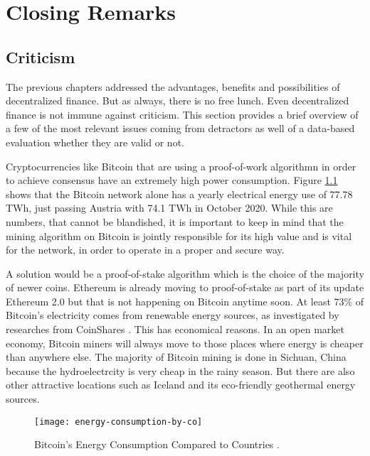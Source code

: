 \chapter{Closing Remarks}
\label{cha:ClosingRemarks}

\section{Criticism}

The previous chapters addressed the advantages, benefits and possibilities of decentralized finance. But as always, there is no free lunch.
Even decentralized finance is not immune against criticism. This section provides a brief overview of a few of the most relevant issues coming
from detractors as well of a data-based evaluation whether they are valid or not.

Cryptocurrencies like Bitcoin that are using a proof-of-work algorithmn in order to achieve consensus have an extremely high power consumption.
Figure \ref{fig:BtcEnergy} shows that the Bitcoin network alone has a yearly electrical energy use of 77.78 TWh, just passing Austria with
74.1 TWh in October 2020. While this are numbers, that cannot be blandished, it is important to keep in mind that the mining algorithm on
Bitcoin is jointly responsible for its high value and is vital for the network, in order to operate in a proper and secure way.

A solution would be a proof-of-stake algorithm which is the choice of the majority of newer coins. Ethereum is already moving to proof-of-stake
as part of its update Ethereum 2.0 but that is not happening on Bitcoin anytime soon. At least 73\% of Bitcoin's electricity comes from
renewable energy sources, as investigated by researches from CoinShares \cite[p.\ 8]{CoinShares2019}. This has economical reasons. In an open
market economy, Bitcoin miners will always move to those places where energy is cheaper than anywhere else. The majority of Bitcoin mining is
done in Sichuan, China because the hydroelectrcity is very cheap in the rainy season. But there are also other attractive locations such as
Iceland and its eco-friendly geothermal energy sources.

\begin{figure}
\centering
\texttt{[image: energy-consumption-by-co]}
\caption{Bitcoin's Energy Consumption Compared to Countries \cite{Digiconomist2020}.}
\label{fig:BtcEnergy}
\end{figure}

